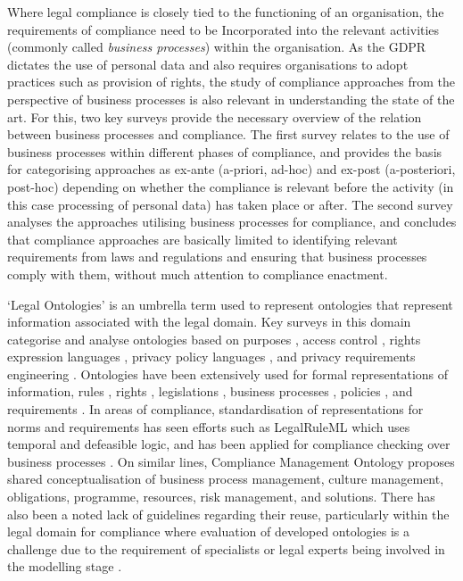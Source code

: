 Where legal compliance is closely tied to the functioning of an organisation, the requirements of compliance need to be Incorporated into the relevant activities (commonly called \textit{business processes}) within the organisation.
As the GDPR dictates the use of personal data and also requires organisations to adopt practices such as provision of rights, the study of compliance approaches from the perspective of business processes is also relevant in understanding the state of the art. 
For this, two key surveys provide the necessary overview of the relation between business processes and compliance. The first survey \cite{fellmann_state---art_2014} relates to the use of business processes within different phases of compliance, and provides the basis for categorising approaches as ex-ante (a-priori, ad-hoc) and ex-post (a-posteriori, post-hoc) depending on whether the compliance is relevant before the activity (in this case processing of personal data) has taken place or after. The second survey \cite{benyoucef_information_2015} analyses the approaches utilising business processes for compliance, and concludes that compliance approaches are basically limited to identifying relevant requirements from laws and regulations and ensuring that business processes comply with them, without much attention to compliance enactment.

`Legal Ontologies' is an umbrella term used to represent ontologies that represent information associated with the legal domain.
Key surveys in this domain categorise and analyse ontologies based on 
purposes \cite{leone_taking_2019,rodrigues_legal_2019}, 
access control \cite{kirrane_access_2016}, 
rights expression languages \cite{pellegrini_genealogy_2018}, 
privacy policy languages \cite{van_de_ven_qualitative_2016}, and
privacy requirements engineering \cite{gharib_ontologies_2016}.
Ontologies have been extensively used for formal representations of information, rules \cite{kirrane_scalable_2018}, rights \cite{pellegrini_genealogy_2018}, legislations \cite{leone_taking_2019}, business processes \cite{elgammal_formalizing_2016}, policies \cite{van_de_ven_qualitative_2016}, and requirements \cite{gharib_ontologies_2016}.
In areas of compliance, standardisation of representations for norms and requirements has seen efforts such as LegalRuleML \cite{palmirani_legalruleml:_2011} which uses temporal and defeasible logic, and has been applied for compliance checking over business processes \cite{governatori_semantic_2016}. On similar lines, Compliance Management Ontology \cite{syed_abdullah_compliance_2012} proposes shared conceptualisation of business process management, culture management, obligations, programme, resources, risk management, and solutions.
There has also been a noted lack of guidelines regarding their reuse, particularly within the legal domain for compliance \cite{casanovas_legal_2017} where evaluation of developed ontologies is a challenge due to the requirement of specialists or legal experts being involved in the modelling stage \cite{rodrigues_legal_2019}.

